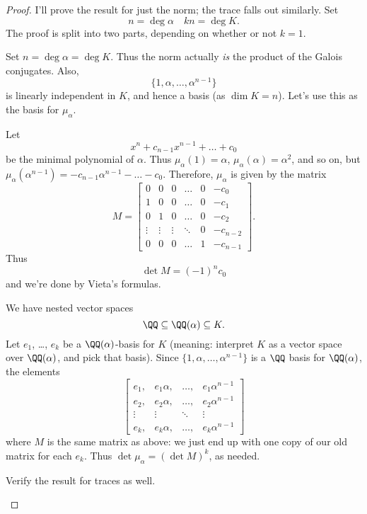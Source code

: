 \begin{proof}
I'll prove the result for just the norm; the trace falls out similarly.
Set
\[ n = \deg \alpha \quad kn = \deg K. \]
The proof is split into two parts, depending on whether or not $k=1$.
\begin{subproof}[Proof if $k=1$]
	Set $n = \deg \alpha = \deg K$.
	Thus the norm actually \emph{is} the product of the Galois conjugates.
	Also, \[ \{1, \alpha, \dots, \alpha^{n-1}\} \]
	is linearly independent in $K$, and hence a basis (as $\dim K = n$).
	Let's use this as the basis for $\mu_\alpha$.

	Let \[ x^n+c_{n-1}x^{n-1} + \dots + c_0  \]be the minimal polynomial of $\alpha$.
	Thus $\mu_\alpha(1) = \alpha$, $\mu_\alpha(\alpha) = \alpha^2$, and so on,
	but $\mu_\alpha(\alpha^{n-1}) = -c_{n-1}\alpha^{n-1} - \dots - c_0$.
	Therefore, $\mu_\alpha$ is given by the matrix
	\[
		M = 
		\begin{bmatrix}
			0 & 0 & 0 & \dots & 0 & -c_0 \\
			1 & 0 & 0 & \dots & 0 & -c_1 \\
			0 & 1 & 0 & \dots & 0 & -c_2 \\
			\vdots & \vdots & \vdots & \ddots & 0 & -c_{n-2} \\
			0 & 0 & 0 & \dots & 1 & -c_{n-1}
		\end{bmatrix}.
	\]
	Thus \[ \det M = (-1)^n c_0 \] and we're done by Vieta's formulas.
\end{subproof}
\begin{subproof}[Proof if $k > 1$]
	We have nested vector spaces
	\[ \QQ \subseteq \QQ(\alpha) \subseteq K. \]
	Let $e_1$, \dots, $e_k$ be a $\QQ(\alpha)$-basis for $K$
	(meaning: interpret $K$ as a vector space over $\QQ(\alpha)$, and pick that basis).
	Since $\{1, \alpha, \dots, \alpha^{n-1}\}$ is a $\QQ$ basis for $\QQ(\alpha)$,
	the elements
	\[
		\begin{bmatrix}
		e_1, & e_1\alpha, & \dots, & e_1\alpha^{n-1} \\
		e_2, & e_2\alpha, & \dots, & e_2\alpha^{n-1} \\
		\vdots & \vdots & \ddots & \vdots \\
		e_k, & e_k\alpha, & \dots, & e_k\alpha^{n-1}
		\end{bmatrix}
	\]
	where $M$ is the same matrix as above:
	we just end up with one copy of our old matrix for each $e_k$.
	Thus $\det \mu_\alpha = (\det M)^k$, as needed. \qedhere
\end{subproof}
\begin{ques}
	Verify the result for traces as well. \qedhere
\end{ques}
\end{proof}

